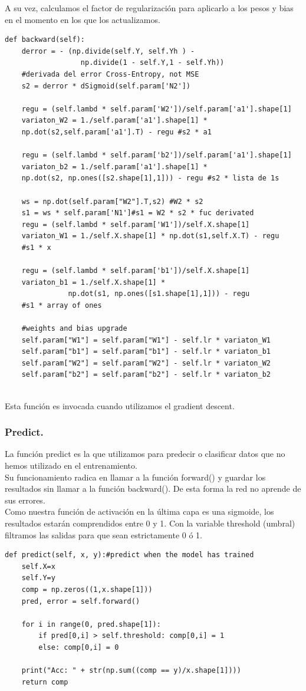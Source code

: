 \documentclass[a4paper,11pt]{article}
\begin{document}
\noindent
A su vez, calculamos el factor de regularización para aplicarlo a los pesos y bias en el momento en los que los actualizamos.
\begin{lstlisting}
def backward(self):
    derror = - (np.divide(self.Y, self.Yh ) - 
                  np.divide(1 - self.Y,1 - self.Yh))
    #derivada del error Cross-Entropy, not MSE
    s2 = derror * dSigmoid(self.param['N2']) 

    regu = (self.lambd * self.param['W2'])/self.param['a1'].shape[1]
    variaton_W2 = 1./self.param['a1'].shape[1] *
    np.dot(s2,self.param['a1'].T) - regu #s2 * a1

    regu = (self.lambd * self.param['b2'])/self.param['a1'].shape[1]
    variaton_b2 = 1./self.param['a1'].shape[1] * 
    np.dot(s2, np.ones([s2.shape[1],1])) - regu #s2 * lista de 1s

    ws = np.dot(self.param["W2"].T,s2) #W2 * s2                    
    s1 = ws * self.param['N1']#s1 = W2 * s2 * fuc derivated      
    regu = (self.lambd * self.param['W1'])/self.X.shape[1]
    variaton_W1 = 1./self.X.shape[1] * np.dot(s1,self.X.T) - regu
    #s1 * x

    regu = (self.lambd * self.param['b1'])/self.X.shape[1]
    variaton_b1 = 1./self.X.shape[1] * 
               np.dot(s1, np.ones([s1.shape[1],1])) - regu 
    #s1 * array of ones 
    
    #weights and bias upgrade
    self.param["W1"] = self.param["W1"] - self.lr * variaton_W1 
    self.param["b1"] = self.param["b1"] - self.lr * variaton_b1 
    self.param["W2"] = self.param["W2"] - self.lr * variaton_W2 
    self.param["b2"] = self.param["b2"] - self.lr * variaton_b2
        
\end{lstlisting}
Esta función es invocada cuando utilizamos el gradient descent.
\subsubsection{Predict.}

La función predict es la que utilizamos para predecir o clasificar datos que no hemos utilizado en el entrenamiento.\\ 

\noindent
Su funcionamiento radica en llamar a la función forward() y guardar los resultados sin llamar a la función backward(). De esta forma la red no aprende de sus errores. \\

\noindent
Como nuestra función de activación en la última capa es una sigmoide, los resultados estarán comprendidos entre 0 y 1. Con la variable threshold (umbral) filtramos las salidas para que sean estrictamente 0 ó 1.  
\begin{lstlisting}
def predict(self, x, y):#predict when the model has trained
    self.X=x
    self.Y=y
    comp = np.zeros((1,x.shape[1]))
    pred, error = self.forward()    
    
    for i in range(0, pred.shape[1]):
        if pred[0,i] > self.threshold: comp[0,i] = 1
        else: comp[0,i] = 0
    
    print("Acc: " + str(np.sum((comp == y)/x.shape[1]))) 
    return comp
\end{lstlisting}
\end{document}
